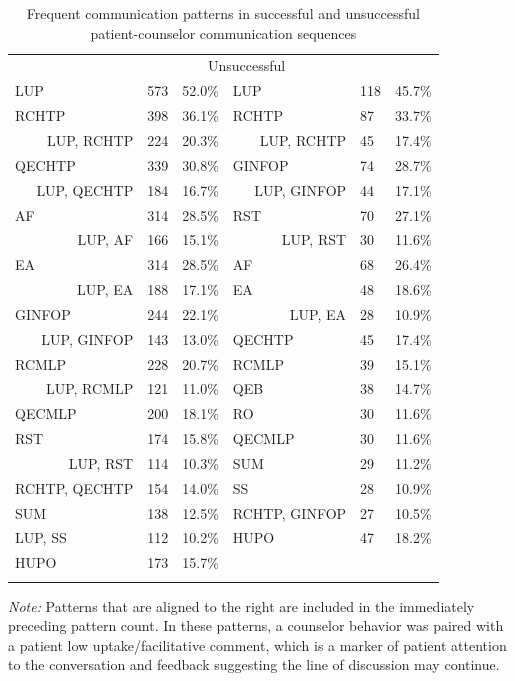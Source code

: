 \documentclass[smallextended]{svjour3}       %
\begin{document}
\begin{table}
\begin{threeparttable}
\caption{Frequent communication patterns in successful and unsuccessful patient-counselor communication sequences}
\label{tab:patterns}   
\begin{tabularx}{\textwidth}{p{3cm}XX@{\extracolsep{4pt}}p{3cm}XX}
\hline\noalign{\smallskip}
\multicolumn{3}{c}{Successful} & \multicolumn{3}{c}{Unsuccessful} \\
\noalign{\smallskip}\cline{1-3} \cline{4-6}\noalign{\smallskip}
LUP & 573 & 52.0\% & LUP & 118 & 45.7\%  \\
RCHTP & 398 & 36.1\% & RCHTP & 87 & 33.7\% \\ 
\multicolumn{1}{r}{LUP, RCHTP} & 224 & 20.3\% & \multicolumn{1}{r}{LUP, RCHTP} & 45 & 17.4\% \\
QECHTP & 339 & 30.8\% & GINFOP & 74 & 28.7\% \\
\multicolumn{1}{r}{LUP, QECHTP} & 184 & 16.7\% & \multicolumn{1}{r}{LUP, GINFOP} & 44 & 17.1\% \\
AF & 314 & 28.5\% & RST & 70 & 27.1\% \\
\multicolumn{1}{r}{LUP, AF} & 166 & 15.1\% & \multicolumn{1}{r}{LUP, RST} & 30 & 11.6\% \\
EA & 314 & 28.5\% & AF & 68 & 26.4\% \\
\multicolumn{1}{r}{LUP, EA} & 188 & 17.1\% & EA & 48 & 18.6\% \\
GINFOP & 244 & 22.1\% & \multicolumn{1}{r}{LUP, EA} & 28 & 10.9\% \\
\multicolumn{1}{r}{LUP, GINFOP} & 143 & 13.0\% & QECHTP & 45 & 17.4\% \\
RCMLP & 228 & 20.7\% & RCMLP & 39 & 15.1\% \\
\multicolumn{1}{r}{LUP, RCMLP} & 121 & 11.0\% & QEB & 38 & 14.7\% \\
QECMLP & 200 & 18.1\% & RO & 30 & 11.6\% \\
RST & 174 & 15.8\% & QECMLP & 30 & 11.6\% \\
\multicolumn{1}{r}{LUP, RST} & 114 & 10.3\% & SUM & 29 & 11.2\% \\
RCHTP, QECHTP & 154 & 14.0\% & SS & 28 & 10.9\% \\
SUM & 138 & 12.5\% & RCHTP, GINFOP & 27 & 10.5\% \\
LUP, SS & 112 & 10.2\% & HUPO & 47 & 18.2\% \\
HUPO & 173 & 15.7\% &  &  &  \\ 
\noalign{\smallskip}\hline
\end{tabularx}
\begin{tablenotes}
      \small
      \item \textit{Note:} Patterns that are aligned to the right are included in the immediately preceding pattern count. In these patterns, a counselor behavior was paired with a patient low uptake/facilitative comment, which is a marker of patient attention to the conversation and feedback suggesting the line of discussion may continue.
\end{tablenotes}
\end{threeparttable}
\end{table}
\end{document}
